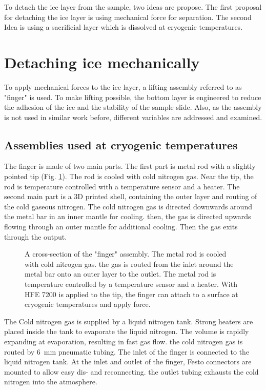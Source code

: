 
To detach the ice layer from the sample, two ideas are propose. The first proposal for detaching the ice layer is using mechanical force for separation. The second Idea is using a sacrificial layer which is dissolved at cryogenic temperatures.

\section{Detaching ice mechanically}

 To apply mechanical forces to the ice layer, a lifting assembly referred to as "finger" is used. To make lifting possible, the bottom layer is engineered to reduce the adhesion of the ice and the stability of the sample slide. Also, as the assembly is not used in similar work before, different variables are addressed and examined.  

\subsection{Assemblies used at cryogenic temperatures}

The finger is made of two main parts. The first part is metal rod with a slightly pointed tip (Fig. \ref{fig:querschnittfinger}). The rod is cooled with cold nitrogen gas. Near the tip, the rod is temperature controlled with a temperature sensor and a heater. The second main part is a 3D printed shell, containing the outer layer and routing of the cold gaseous nitrogen. The cold nitrogen gas is directed downwards around the metal bar in an inner mantle for cooling. then, the gas is directed upwards flowing through an outer mantle for additional cooling. Then the gas exits through the output.

\begin{figure}[hbt!]
	\centering
	
	\caption{A cross-section of the "finger" assembly. The metal rod is cooled with cold nitrogen gas. the gas is routed from the inlet around the metal bar onto an outer layer to the outlet. The metal rod is temperature controlled by a temperature sensor and a heater. With HFE 7200 is applied to the tip, the finger can attach to a surface at cryogenic temperatures and apply force. }
	\label{fig:querschnittfinger}
\end{figure}

The Cold nitrogen gas is supplied by a liquid nitrogen tank. Strong heaters are placed inside the tank to evaporate the liquid nitrogen. The volume is rapidly expanding at evaporation, resulting in fast gas flow. the cold nitrogen gas is routed by \SI{6}{\milli\meter} pneumatic tubing. The inlet of the finger is connected to the liquid nitrogen tank. At the inlet and outlet of the finger, Festo connectors are mounted to allow easy dis- and reconnecting. the outlet tubing exhausts the cold nitrogen into the atmosphere.

